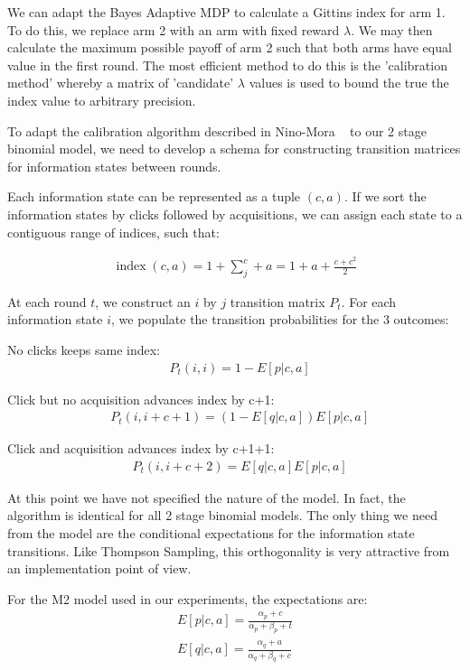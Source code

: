 \documentclass[11pt,a4,singlespacing,titlepagenumber=on]{scrreprt}
\numberwithin{equation}{chapter} %
\theoremstyle{remark}
\begin{document}
We can adapt the Bayes Adaptive MDP to calculate a Gittins index for arm 1. To do this, we replace arm 2 with an arm with fixed reward $\lambda$. We may then calculate the maximum possible payoff of arm 2 such that both arms have equal value in the first round. The most efficient method to do this is the 'calibration method' whereby a matrix of 'candidate' $\lambda$ values is used to bound the true the index value to arbitrary precision.

To adapt the calibration algorithm described in Nino-Mora ~\cite{nino2011computing} to our 2 stage binomial model, we need to develop a schema for constructing transition matrices for information states between rounds.

Each information state can be represented as a tuple $(c,a)$. If we sort the information states by clicks followed by acquisitions, we can assign each state to a contiguous range of indices, such that:

\begin{align}
	\operatorname{index}(c,a) = 1 + \sum_j^c + a = 1 + a + \frac{c + c^2}{2} 
\end{align}

At each round $t$, we construct an $i$ by $j$ transition matrix $P_t$. For each information state $i$, we populate the transition probabilities for the 3 outcomes:

No clicks keeps same index:
\begin{align}
	&P_t(i,i) = 1 - E[p|c,a]
\end{align}

Click but no acquisition advances index by c+1:
\begin{align}
	&P_t(i,i+c+1) = (1 - E[q|c,a])E[p|c,a] 
\end{align}

Click and acquisition advances index by c+1+1:
\begin{align}
	&P_t(i,i+c+2) = E[q|c,a]E[p|c,a] 
\end{align}

At this point we have not specified the nature of the model. In fact, the algorithm is identical for all 2 stage binomial models. The only thing we need from the model are the conditional expectations for the information state transitions. Like Thompson Sampling, this orthogonality is very attractive from an implementation point of view.

For the M2 model used in our experiments, the expectations are:
\begin{align}
	E[p|c,a] = \frac{\alpha_p + c}{\alpha_p + \beta_p + t} \\
	E[q|c,a] = \frac{\alpha_q + a}{\alpha_q + \beta_q + c}
\end{align}
\end{document}

